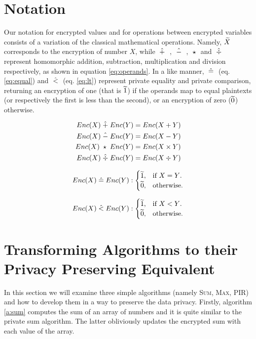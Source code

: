 \section{Notation}\label{s:notation}
Our notation for encrypted values and for operations between encrypted variables consists of a variation of the classical mathematical operations.
Namely, $\widetilde{X}$ corresponds to the encryption of number $X$, while $\;\hat{+}\;$ , $\;\hat{-}\;$ , $\;\star\;$ and $\;\hat{\div}\;$ represent homomorphic addition, subtraction, multiplication and division respectively, as shown in equation \ref{eq:operands}.
In a like manner, $\;\hat{=}\;$ (eq. \ref{eq:equal}) and $\;\hat{<}\;$ (eq. \ref{eq:lt}) represent private equality and private comparison, returning an encryption of one (that is $\widetilde{1}$) if the operands map to equal plaintexts (or respectively the first is less than the second), or an encryption of zero ($\widetilde{0}$) otherwise.

\begin{equation}\label{eq:operands}
  \begin{aligned}
      Enc(X) \;\hat{+}\; Enc(Y) = Enc(X + Y)\\
      Enc(X) \;\hat{-}\; Enc(Y) = Enc(X - Y)\\
      Enc(X) \;\star\; Enc(Y) = Enc(X \times Y)\\
      Enc(X) \;\hat{\div}\; Enc(Y) = Enc(X \div Y)
  \end{aligned}
\end{equation}

\begin{equation}\label{eq:equal}
  Enc(X) \;\hat{=}\; Enc(Y) :\begin{cases}
    \widetilde{1}, & \text{if $X = Y$}.\\
    \widetilde{0}, & \text{otherwise}.
  \end{cases}
\end{equation}

\begin{equation}\label{eq:lt}
  Enc(X) \;\hat{<}\; Enc(Y) :\begin{cases}
    \widetilde{1}, & \text{if $X < Y$}.\\
    \widetilde{0}, & \text{otherwise}.
  \end{cases}
\end{equation}



\section{Transforming Algorithms to their Privacy Preserving Equivalent}\label{s:simple-algorithms}
In this section we will examine three simple algorithms (namely {\textsc{Sum}, \textsc{Max}, \textsc{PIR}}) and how to develop them in a way to preserve the data privacy.
Firstly, algorithm \ref{a:sum} computes the sum of an array of numbers and it is quite similar to the private sum algorithm.
The latter obliviously updates the encrypted sum with each value of the array.

